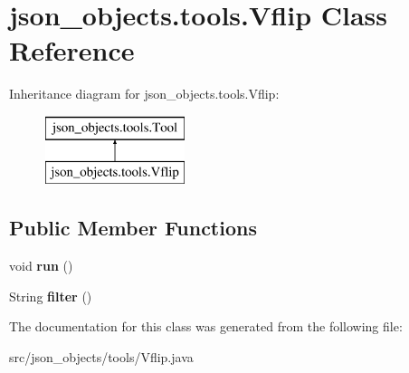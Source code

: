 \hypertarget{classjson__objects_1_1tools_1_1_vflip}{
\section{json\_\-objects.tools.Vflip Class Reference}
\label{classjson__objects_1_1tools_1_1_vflip}
}
Inheritance diagram for json\_\-objects.tools.Vflip:\begin{figure}[H]
\begin{center}
\leavevmode
\includegraphics[height=2.000000cm]{classjson__objects_1_1tools_1_1_vflip}
\end{center}
\end{figure}
\subsection*{Public Member Functions}
\begin{DoxyCompactItemize}
\item 
\hypertarget{classjson__objects_1_1tools_1_1_vflip_ad8b56d687ede2a81da54e226a23db635}{
void {\bfseries run} ()}
\label{classjson__objects_1_1tools_1_1_vflip_ad8b56d687ede2a81da54e226a23db635}

\item 
\hypertarget{classjson__objects_1_1tools_1_1_vflip_a050e0ebafcd46263aea9702bb869e430}{
String {\bfseries filter} ()}
\label{classjson__objects_1_1tools_1_1_vflip_a050e0ebafcd46263aea9702bb869e430}

\end{DoxyCompactItemize}


The documentation for this class was generated from the following file:\begin{DoxyCompactItemize}
\item 
src/json\_\-objects/tools/Vflip.java\end{DoxyCompactItemize}
